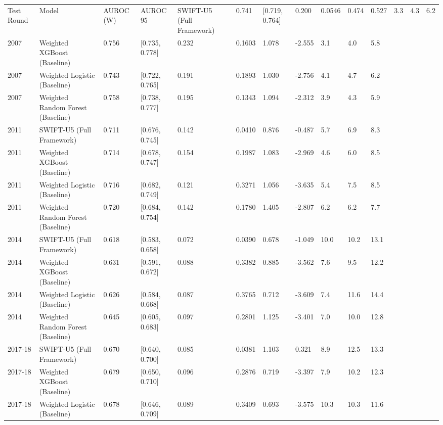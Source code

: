 \begin{table}[htbp]
\centering
\small
\begin{tabular}{lllllllllll}
\toprule
Test Round & Model & AUROC (W) & AUROC 95%
 & SWIFT-U5 (Full Framework) & 0.741 & [0.719, 0.764] & 0.200 & 0.0546 & 0.474 & 0.527 & 3.3 & 4.3 & 6.2 \\
2007 & Weighted XGBoost (Baseline) & 0.756 & [0.735, 0.778] & 0.232 & 0.1603 & 1.078 & -2.555 & 3.1 & 4.0 & 5.8 \\
2007 & Weighted Logistic (Baseline) & 0.743 & [0.722, 0.765] & 0.191 & 0.1893 & 1.030 & -2.756 & 4.1 & 4.7 & 6.2 \\
2007 & Weighted Random Forest (Baseline) & 0.758 & [0.738, 0.777] & 0.195 & 0.1343 & 1.094 & -2.312 & 3.9 & 4.3 & 5.9 \\
2011 & SWIFT-U5 (Full Framework) & 0.711 & [0.676, 0.745] & 0.142 & 0.0410 & 0.876 & -0.487 & 5.7 & 6.9 & 8.3 \\
2011 & Weighted XGBoost (Baseline) & 0.714 & [0.678, 0.747] & 0.154 & 0.1987 & 1.083 & -2.969 & 4.6 & 6.0 & 8.5 \\
2011 & Weighted Logistic (Baseline) & 0.716 & [0.682, 0.749] & 0.121 & 0.3271 & 1.056 & -3.635 & 5.4 & 7.5 & 8.5 \\
2011 & Weighted Random Forest (Baseline) & 0.720 & [0.684, 0.754] & 0.142 & 0.1780 & 1.405 & -2.807 & 6.2 & 6.2 & 7.7 \\
2014 & SWIFT-U5 (Full Framework) & 0.618 & [0.583, 0.658] & 0.072 & 0.0390 & 0.678 & -1.049 & 10.0 & 10.2 & 13.1 \\
2014 & Weighted XGBoost (Baseline) & 0.631 & [0.591, 0.672] & 0.088 & 0.3382 & 0.885 & -3.562 & 7.6 & 9.5 & 12.2 \\
2014 & Weighted Logistic (Baseline) & 0.626 & [0.584, 0.668] & 0.087 & 0.3765 & 0.712 & -3.609 & 7.4 & 11.6 & 14.4 \\
2014 & Weighted Random Forest (Baseline) & 0.645 & [0.605, 0.683] & 0.097 & 0.2801 & 1.125 & -3.401 & 7.0 & 10.0 & 12.8 \\
2017-18 & SWIFT-U5 (Full Framework) & 0.670 & [0.640, 0.700] & 0.085 & 0.0381 & 1.103 & 0.321 & 8.9 & 12.5 & 13.3 \\
2017-18 & Weighted XGBoost (Baseline) & 0.679 & [0.650, 0.710] & 0.096 & 0.2876 & 0.719 & -3.397 & 7.9 & 10.2 & 12.3 \\
2017-18 & Weighted Logistic (Baseline) & 0.678 & [0.646, 0.709] & 0.089 & 0.3409 & 0.693 & -3.575 & 10.3 & 10.3 & 11.6 \\

\end{tabular}
\end{table}
